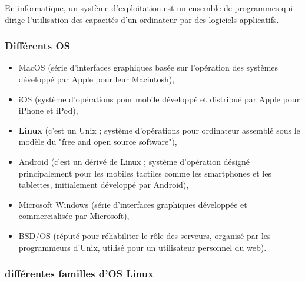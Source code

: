 En informatique, un système d'exploitation est un ensemble de programmes qui dirige l'utilisation des capacités d'un ordinateur
par des logiciels applicatifs.\newline

\subsubsection{Différents OS}

\begin{itemize}
\item MacOS (série d'interfaces graphiques basée sur l'opération des systèmes développé par Apple pour leur Macintosh),
\item iOS (système d'opérations pour mobile développé et distribué par Apple pour iPhone et iPod),
\item \textbf{Linux} (c'est un Unix ; système d'opérations pour ordinateur assemblé sous le modèle du "free and open source software"),
\item Android (c'est un dérivé de Linux ; système d'opération désigné principalement pour les mobiles tactiles comme les smartphones
et les tablettes, initialement développé par Android),
\item Microsoft Windows (série d'interfaces graphiques développée et commercialisée par Microsoft),
\item BSD/OS (réputé pour réhabiliter le rôle des serveurs, organisé par les programmeurs d'Unix, utilisé pour un utilisateur personnel du web).\newline
\end{itemize}


\subsubsection{différentes familles d'OS Linux}

